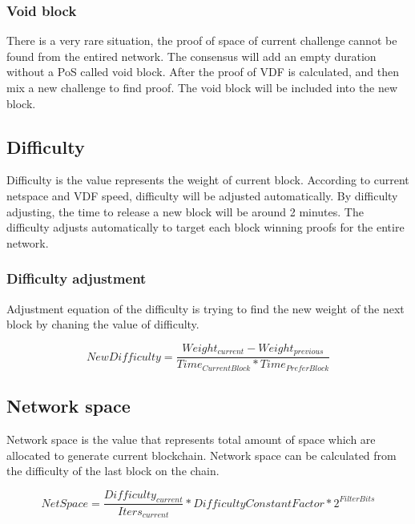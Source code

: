 \subsubsection{Void block}
\begin{flushleft}
    There is a very rare situation, the proof of space of current challenge cannot be found from the entired network. The consensus will add an empty duration without a PoS called void block. After the proof of VDF is calculated, and then mix a new challenge to find proof. The void block will be included into the new block.
\end{flushleft}
\subsection{Difficulty}
\begin{flushleft}
    Difficulty is the value represents the weight of current block. According to current netspace and VDF speed, difficulty will be adjusted automatically. By difficulty adjusting, the time to release a new block will be around 2 minutes. The difficulty adjusts automatically to target each block winning proofs for the entire network.
\end{flushleft}
\subsubsection{Difficulty adjustment}
\begin{flushleft}
    Adjustment equation of the difficulty is trying to find the new weight of the next block by chaning the value of difficulty.
\end{flushleft}
\begin{equation}
    NewDifficulty = \frac{Weight_{current} - Weight_{previous}}{Time_{CurrentBlock} * Time_{PreferBlock}}
\end{equation}
\subsection{Network space}
\begin{flushleft}
    Network space is the value that represents total amount of space which are allocated to generate current blockchain. Network space can be calculated from the difficulty of the last block on the chain.
\end{flushleft}
\begin{equation}
    NetSpace = \frac{Difficulty_{current}}{Iters_{current}}*{DifficultyConstantFactor}*2^{FilterBits}
\end{equation}
